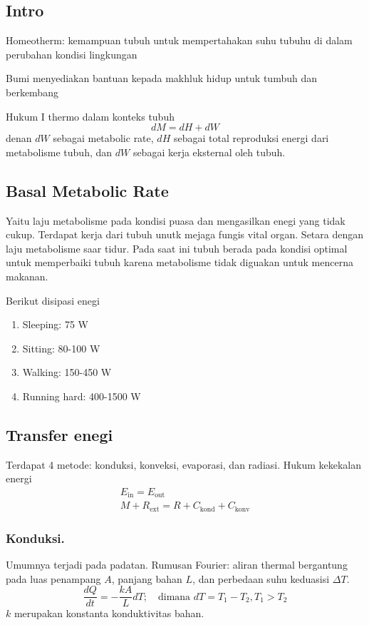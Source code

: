 \documentclass[../main.tex]{subfiles}
\begin{document}
\subsection*{Intro}
Homeotherm: kemampuan tubuh untuk mempertahakan suhu tubuhu di dalam perubahan kondisi lingkungan

Bumi menyediakan bantuan kepada makhluk hidup untuk tumbuh dan berkembang

Hukum I thermo dalam konteks tubuh
\begin{equation*}
    dM=dH+dW
\end{equation*}
denan $dW$ sebagai metabolic rate, $dH$ sebagai total reproduksi energi dari metabolisme tubuh, dan $dW$ sebagai kerja eksternal oleh tubuh. 

\subsection{Basal Metabolic Rate}
Yaitu laju metabolisme pada kondisi puasa dan mengasilkan enegi yang tidak cukup. Terdapat kerja dari tubuh unutk mejaga fungis vital organ. Setara dengan laju metabolisme saar tidur. Pada saat ini tubuh berada pada kondisi optimal untuk memperbaiki tubuh karena metabolisme tidak diguakan untuk mencerna makanan.

Berikut disipasi enegi
\begin{enumerate}
    \item Sleeping: 75 W 
    \item Sitting: 80-100 W 
    \item Walking: 150-450 W 
    \item Running hard: 400-1500 W 
\end{enumerate}

\subsection*{Transfer enegi}
Terdapat 4 metode: konduksi, konveksi, evaporasi, dan radiasi. Hukum kekekalan energi 
\begin{align*}
    E_\text{in}=E_\text{out}\\
    M+R_\text{ext}=R+C_\text{kond}+C_\text{konv}
\end{align*}

\subsubsection*{Konduksi.} Umumnya terjadi pada padatan. Rumusan Fourier: aliran thermal bergantung pada luas penampang $A$, panjang bahan $L$, dan perbedaan suhu keduasisi $\Delta T$. 
\begin{equation*}
    \frac{dQ}{dt}=-\frac{kA}{L}dT;\quad\text{dimana }dT=T_1-T_2,T_1>T_2
\end{equation*}
$k$ merupakan konstanta konduktivitas bahan. 
\end{document}
